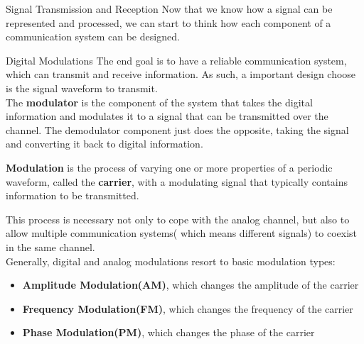 \begin{section}{Signal Transmission and Reception}
  Now that we know how a signal can be represented and processed, we can start to think how each 
  component of a communication system can be designed.\\
  \begin{subsection}{Digital Modulations}
    The end goal is to have a reliable communication system, which can transmit and receive
    information. As such, a important design choose is the signal waveform to transmit.\\
    The \textbf{modulator} is the component of the system that takes the digital information and 
    modulates it to a signal that can be transmitted over the channel. The demodulator component 
    just does the opposite, taking the signal and converting it back to digital information.\\

    \begin{boxH}
      \textbf{Modulation} is the process of varying one or more properties of a periodic waveform, called
      the \textbf{carrier}, with a modulating signal that typically contains information to be
      transmitted.
    \end{boxH}
    This process is necessary not only to cope with the analog channel, but also to allow multiple
    communication systems( which means different signals) to coexist in the same channel.\\

    Generally, digital and analog modulations resort to basic modulation types:
    \begin{itemize}
      \item \textbf{Amplitude Modulation(AM)}, which changes the amplitude of the carrier
      \item \textbf{Frequency Modulation(FM)}, which changes the frequency of the carrier
      \item \textbf{Phase Modulation(PM)}, which changes the phase of the carrier
    \end{itemize}


\end{subsection}
\end{section}

